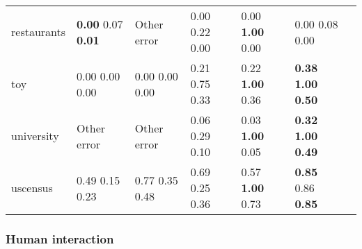 \begin{table}[h]
\begin{adjustbox}{center}
\begin{tabular}{lllllll}
restaurants &  \textbf{0.00} 0.07  \textbf{0.01}  &                 Other error &                  0.00  0.22  0.00   &          0.00  \textbf{1.00} 0.00   &                          0.00  0.08  0.00   \\
toy         &                  0.00  0.00  0.00   &          0.00  0.00  0.00   &                  0.21  0.75  0.33   &          0.22  \textbf{1.00} 0.36   &  \textbf{0.38} \textbf{1.00} \textbf{0.50}  \\
university  &                         Other error &                 Other error &                  0.06  0.29  0.10   &          0.03  \textbf{1.00} 0.05   &  \textbf{0.32} \textbf{1.00} \textbf{0.49}  \\
uscensus    &                  0.49  0.15  0.23   &          0.77  0.35  0.48   &                  0.69  0.25  0.36   &          0.57  \textbf{1.00} 0.73   &          \textbf{0.85} 0.86  \textbf{0.85}  \\
\bottomrule
\end{tabular}
\end{adjustbox}
\end{table}

\subsubsection{Human interaction}

